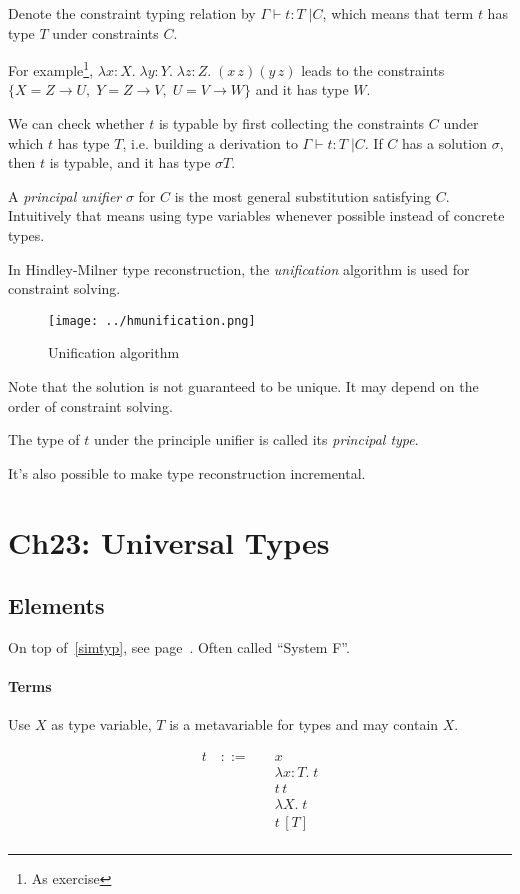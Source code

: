 \documentclass{article}
\newcommand{\lam}[2]{\lambda #1 .\;#2}
\newcommand{\lamt}[3]{\lambda #1: #2 .\;#3}
\newcommand{\app}[2]{#1\, #2}
\newcommand{\appp}[2]{\left(#1\, #2\right)}
\newcommand{\tapp}[2]{#1\, \left[#2\right]}
\newcommand{\typjudc}[3]{\Gamma \vdash #1: #2 \;| #3}
\begin{document}
  Denote the constraint typing relation by $\typjudc{t}{T}{C}$, which means that term $t$ has type $T$ under constraints $C$.

  For example\footnote{As exercise},
  $\lamt{x}{X}{\lamt{y}{Y}{\lamt{z}{Z}{\appp{x}{z} \appp{y}{z}}}}$
  leads to the constraints $\{ X=Z\to U,\; Y=Z\to V,\; U=V\to W\}$ and it has type $W$.

  We can check whether $t$ is typable by first collecting the constraints $C$ under which $t$ has type $T$, i.e. building a derivation to $\typjudc{t}{T}{C}$. If $C$ has a solution $\sigma$, then $t$ is typable, and it has type $\sigma T$.

  A \emph{principal unifier} $\sigma$ for $C$ is the most general substitution satisfying $C$.
  Intuitively that means using type variables whenever possible instead of concrete types.

  In Hindley-Milner type reconstruction, the \emph{unification} algorithm is used for constraint solving.
  \begin{figure}
    \centering
    \texttt{[image: ../hmunification.png]}
    \caption{Unification algorithm}
    \label{hm-uni-algo}
  \end{figure}
  Note that the solution is not guaranteed to be unique. It may depend on the order of constraint solving.

  The type of $t$ under the principle unifier is called its \emph{principal type}.

  It's also possible to make type reconstruction incremental.



\section{Ch23: Universal Types}
\subsection{Elements}
  \label{systemf}
  On top of~\ref{simtyp}, see page~\pageref{simtyp}.
  Often called ``System F''.

\paragraph{Terms}
  Use $X$ as type variable, $T$ is a metavariable for types and may contain $X$.

  \begin{align*}
    t \quad ::= \quad
      & x \tag{var} \\
      & \lamt{x}{T}{t} \tag{abs} \\
      & \app{t}{t} \\
      & \lam{X}{t} \tag{type abstraction}\\
      & \tapp{t}{T} \tag{type instantiation}\\
  \end{align*}
\end{document}
